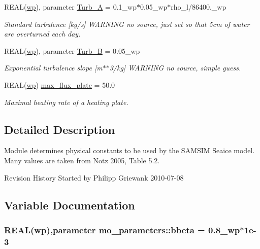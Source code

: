 \begin{DoxyCompactItemize}
REAL(\hyperlink{namespacemo__parameters_a41be20bed1dcec244405328deaaffe30}{wp}), parameter \hyperlink{namespacemo__parameters_a42887cf935636d9eaf3fe6ad8cb3ee34}{Turb\_\-A} = 0.1\_\-wp$\ast$0.05\_\-wp$\ast$rho\_\-l/86400.\_\-wp
\begin{DoxyCompactList}\small\item\em Standard turbulence \mbox{[}kg/s\mbox{]} WARNING no source, just set so that 5cm of water are overturned each day. \item\end{DoxyCompactList}\item 
REAL(\hyperlink{namespacemo__parameters_a41be20bed1dcec244405328deaaffe30}{wp}), parameter \hyperlink{namespacemo__parameters_a9fcd0db13d2536e79d192a96ad2d0712}{Turb\_\-B} = 0.05\_\-wp
\begin{DoxyCompactList}\small\item\em Exponential turbulence slope \mbox{[}m$\ast$$\ast$3/kg\mbox{]} WARNING no source, simple guess. \item\end{DoxyCompactList}\item 
REAL(\hyperlink{namespacemo__parameters_a41be20bed1dcec244405328deaaffe30}{wp}) \hyperlink{namespacemo__parameters_a5bebd9cb4b53f939987065f7ebf4c8b7}{max\_\-flux\_\-plate} = 50.0
\begin{DoxyCompactList}\small\item\em Maximal heating rate of a heating plate. \item\end{DoxyCompactList}\end{DoxyCompactItemize}


\subsection{Detailed Description}
Module determines physical constants to be used by the SAMSIM Seaice model. Many values are taken from Notz 2005, Table 5.2.

\begin{DoxyParagraph}{Revision History}
Started by Philipp Griewank 2010-\/07-\/08 
\end{DoxyParagraph}


\subsection{Variable Documentation}
\hypertarget{namespacemo__parameters_acde561d09dcbc152555d452514b4a71b}{
\subsubsection[{bbeta}]{\setlength{\rightskip}{0pt plus 5cm}REAL({\bf wp}),parameter {\bf mo\_\-parameters::bbeta} = 0.8\_\-wp$\ast$1e-\/3}}
\label{namespacemo__parameters_acde561d09dcbc152555d452514b4a71b}


